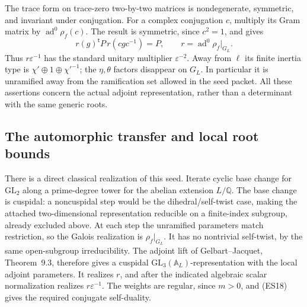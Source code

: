 The trace form on trace-zero two-by-two matrices is
nondegenerate, symmetric, and invariant under conjugation.
For a complex conjugation \(c\), multiply its Gram matrix
by \(\operatorname{ad}^0\rho_f(c)\).
The result is symmetric, since \(c^2=1\), and gives
\[
       r(g)^{\mathsf t}P\,r(cgc^{-1})=P,
                  \qquad r=\operatorname{ad}^0\rho_f|_{G_L}.
 \tag{ES18}
\]
Thus \(r\varepsilon^{-1}\) has the standard unitary
multiplier \(\varepsilon^{-2}\).
Away from \(\ell\) its finite inertia type is
\(\chi'\oplus1\oplus\chi'^{-1}\); the \(\eta,\theta\)
factors disappear on \(G_L\).
In particular it is unramified away from the ramification
set allowed in the seed packet.
All these assertions concern the actual adjoint
representation, rather than a determinant with the same
generic roots.

\subsection{The automorphic transfer and local root bounds}
There is a direct classical realization of this seed.
Iterate cyclic base change for \(\mathrm{GL}_2\) along a
prime-degree tower for the abelian extension \(L/\mathbb Q\).
The base change is cuspidal: a noncuspidal step would be
the dihedral/self-twist case, making the attached
two-dimensional representation reducible on a finite-index
subgroup, already excluded above.
At each step the unramified parameters match restriction,
so the Galois realization is \(\rho_f|_{G_L}\).
It has no nontrivial self-twist, by the same open-subgroup
irreducibility.
The adjoint lift of Gelbart--Jacquet, Theorem~9.3, therefore
gives a cuspidal \(\mathrm{GL}_3(\mathbb A_L)\)-representation
with the local adjoint parameters.
It realizes \(r\), and after the indicated algebraic scalar
normalization realizes \(r\varepsilon^{-1}\).
The weights are regular, since \(m>0\), and (ES18) gives
the required conjugate self-duality.

